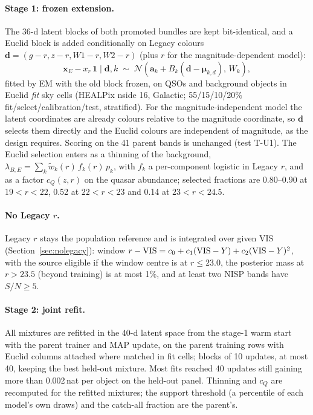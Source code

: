 \documentclass[11pt,a4paper]{article}
\newcommand{\vect}[1]{\boldsymbol{#1}}
\begin{document}
\paragraph{Stage 1: frozen extension.} The 36-d latent blocks of both promoted bundles are kept bit-identical, and
a Euclid block is added conditionally on Legacy colours $\vect d=(g-r,z-r,W1-r,W2-r)$ (plus $r$ for the
magnitude-dependent model):
\begin{equation}
\vect x_E-x_r\,\vect 1\;\big|\;\vect d,k\;\sim\;\mathcal N\!\left(\vect a_k+B_k(\vect d-\vect\mu_{k,d}),\,W_k\right),
\end{equation}
fitted by EM with the old block frozen, on QSOs and background objects in Euclid \emph{fit} sky cells (HEALPix
nside 16, Galactic; 55/15/10/20\% fit/select/calibration/test, stratified). For the magnitude-independent model the
latent coordinates are already colours relative to the magnitude coordinate, so $\vect d$ selects them directly
and the Euclid colours are independent of magnitude, as the design requires. Scoring on the 41 parent bands is
unchanged (test T-U1). The Euclid selection enters as a thinning of the background,
$\lambda_{B,E}=\sum_k\tilde w_k(r)\,f_k(r)\,p_k$, with $f_k$ a per-component logistic in Legacy $r$, and as a factor
$c_Q(z,r)$ on the quasar abundance; selected fractions are 0.80--0.90 at $19<r<22$, 0.52 at $22<r<23$ and 0.14 at
$23<r<24.5$.

\paragraph{No Legacy $r$.} Legacy $r$ stays the population reference and is integrated over given VIS
(Section~\ref{sec:nolegacy}): window $r-{\rm VIS}=c_0+c_1({\rm VIS}-Y)+c_2({\rm VIS}-Y)^2$, with the source eligible if the
window centre is at $r\leq23.0$, the posterior mass at $r>23.5$ (beyond training) is at most 1\%, and at least two
NISP bands have $S/N\geq5$.

\paragraph{Stage 2: joint refit.} All mixtures are refitted in the 40-d latent space from the stage-1 warm start
with the parent trainer and MAP update, on the parent training rows with Euclid columns attached where matched in
fit cells; blocks of 10 updates, at most 40, keeping the best held-out mixture. Most fits reached 40 updates
still gaining more than 0.002\,nat per object on the held-out panel. Thinning and $c_Q$ are recomputed for the
refitted mixtures; the support threshold (a percentile of each model's own draws) and the catch-all fraction are
the parent's.
\end{document}
